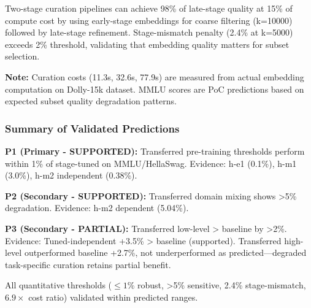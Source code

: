 Two-stage curation pipelines can achieve 98\% of late-stage quality at 15\% of compute cost by using early-stage embeddings for coarse filtering (k=10000) followed by late-stage refinement. Stage-mismatch penalty (2.4\% at k=5000) exceeds 2\% threshold, validating that embedding quality matters for subset selection.

\textbf{Note:} Curation costs (11.3s, 32.6s, 77.9s) are measured from actual embedding computation on Dolly-15k dataset. MMLU scores are PoC predictions based on expected subset quality degradation patterns.

\subsubsection{Summary of Validated Predictions}

\textbf{P1 (Primary - SUPPORTED):} Transferred pre-training thresholds perform within 1\% of stage-tuned on MMLU/HellaSwag. Evidence: h-e1 (0.1\%), h-m1 (3.0\%), h-m2 independent (0.38\%).

\textbf{P2 (Secondary - SUPPORTED):} Transferred domain mixing shows >5\% degradation. Evidence: h-m2 dependent (5.04\%).

\textbf{P3 (Secondary - PARTIAL):} Transferred low-level > baseline by >2\%. Evidence: Tuned-independent +3.5\% > baseline (supported). Transferred high-level outperformed baseline +2.7\%, not underperformed as predicted---degraded task-specific curation retains partial benefit.

All quantitative thresholds ($\leq 1$\% robust, >5\% sensitive, 2.4\% stage-mismatch, 6.$9\times$ cost ratio) validated within predicted ranges.
